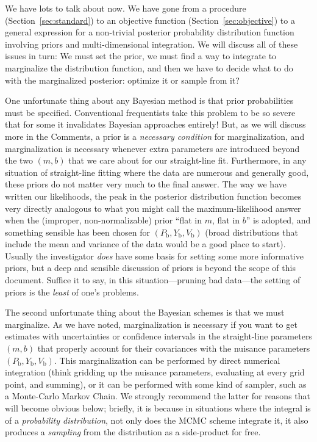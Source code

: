 \documentclass[12pt,twoside]{article}
\newcommand{\documentname}{document}
\newcommand{\sectionname}{Section}
\newcommand{\commentsname}{Comments}
\newcounter{problem}
\newcommand{\Pbad}{P_{\mathrm{b}}}
\newcommand{\Ybad}{Y_{\mathrm{b}}}
\newcommand{\Vbad}{V_{\mathrm{b}}}
\begin{document}
We have lots to talk about now.  We have gone from a procedure
(\sectionname~\ref{sec:standard}) to an objective function
(\sectionname~\ref{sec:objective}) to a general expression for a
non-trivial posterior probability distribution function involving
priors and multi-dimensional integration.  We will discuss all of
these issues in turn: We must set the prior, we must find a way to
integrate to marginalize the distribution function, and then we have
to decide what to do with the marginalized posterior: optimize it or
sample from it?

One unfortunate thing about any Bayes\-ian method is that prior
probabilities must be specified.  Conventional frequentists take this
problem to be so severe that for some it invalidates Bayesian
approaches entirely!  But, as we will discuss more in the
\commentsname, a prior is a \emph{necessary condition} for
marginalization, and marginalization is necessary whenever extra
parameters are introduced beyond the two $(m,b)$ that we care about
for our straight-line fit.  Furthermore, in any situation of
straight-line fitting where the data are numerous and generally good,
these priors do not matter very much to the final answer.  The way we
have written our likelihoods, the peak in the posterior distribution
function becomes very directly analogous to what you might call the
maximum-likelihood answer when the (improper, non-normalizable) prior
``flat in $m$, flat in $b$'' is adopted, and something sensible has
been chosen for $(\Pbad,\Ybad,\Vbad)$ (broad distributions that
include the mean and variance of the data would be a good place to
start).  Usually the investigator \emph{does} have some basis for
setting some more informative priors, but a deep and sensible
discussion of priors is beyond the scope of this \documentname.
Suffice it to say, in this situation---pruning bad data---the setting
of priors is the \emph{least} of one's problems.

The second unfortunate thing about the Bayesian schemes is that we must
marginalize.  As we have noted, marginalization is necessary if you
want to get estimates with uncertainties or confidence intervals in
the straight-line parameters $(m,b)$ that properly account for their
covariances with the nuisance parameters $(\Pbad,\Ybad,\Vbad)$.  This
marginalization can be performed by direct numerical integration
(think gridding up the nuisance parameters, evaluating at every grid
point, and summing), or it can be performed with some kind of sampler,
such as a Monte-Carlo Markov Chain.  We strongly recommend the latter
for reasons that will become obvious below; briefly, it is because in
situations where the integral is of a \emph{probability distribution},
not only does the MCMC scheme integrate it, it also produces a
\emph{sampling} from the distribution as a side-product for free.
\end{document}
